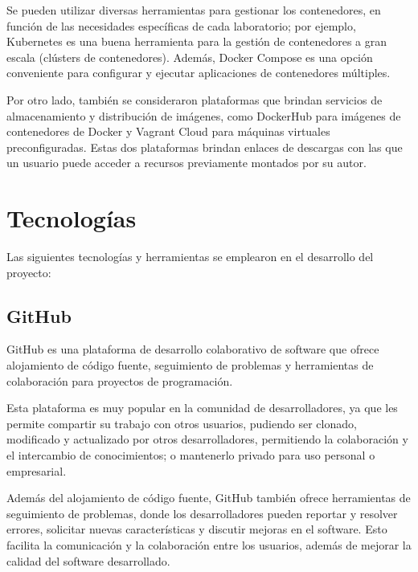             Se pueden utilizar diversas herramientas para gestionar los contenedores, en función de las necesidades específicas de cada laboratorio; por ejemplo, Kubernetes es una buena herramienta para la gestión de contenedores a gran escala (clústers de contenedores). Además, Docker Compose es una opción conveniente para configurar y ejecutar aplicaciones de contenedores múltiples.
            
            Por otro lado, también se consideraron plataformas que brindan servicios de almacenamiento y distribución de imágenes, como DockerHub para imágenes de contenedores de Docker y Vagrant Cloud para máquinas virtuales preconfiguradas. Estas dos plataformas brindan enlaces de descargas con las que un usuario puede acceder a recursos previamente montados por su autor.

            \newpage

            
    \section{Tecnologías}
    
        Las siguientes tecnologías y herramientas se emplearon en el desarrollo del proyecto:
        
        \subsection{GitHub}
        
            GitHub es una plataforma de desarrollo colaborativo de software que ofrece alojamiento de código fuente, seguimiento de problemas y herramientas de colaboración para proyectos de programación.
            
            Esta plataforma es muy popular en la comunidad de desarrolladores, ya que les permite compartir su trabajo con otros usuarios, pudiendo ser clonado, modificado y actualizado por otros desarrolladores, permitiendo la colaboración y el intercambio de conocimientos; o mantenerlo privado para uso personal o empresarial.
            
            Además del alojamiento de código fuente, GitHub también ofrece herramientas de seguimiento de problemas, donde los desarrolladores pueden reportar y resolver errores, solicitar nuevas características y discutir mejoras en el software. Esto facilita la comunicación y la colaboración entre los usuarios, además de mejorar la calidad del software desarrollado.
            
